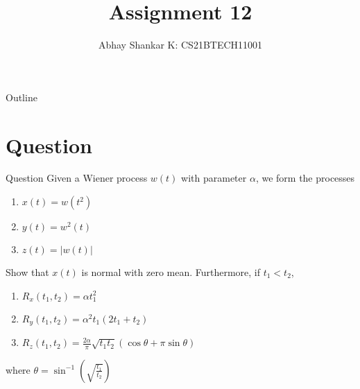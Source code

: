 \documentclass{beamer}
\begin{document}
\newcommand{\bfr}[2]{\section{#1} \begin{frame}{#1} #2 \end{frame}}

	\title{Assignment 12}
		\author{ Abhay Shankar K: CS21BTECH11001}
\date{}
	\begin{frame}
    		\titlepage
	\end{frame}

	\begin{frame}{Outline}
    		\tableofcontents
	\end{frame}

	\providecommand{\brak}[1]{\ensuremath{\left(#1\right)}}
	\providecommand{\mn}[2]{\ensuremath{min\brak{#1, #2}}}
	\providecommand{\mx}[2]{\ensuremath{max\brak{#1, #2}}}
	\providecommand{\rpr}[2]{\ensuremath{P_{#1}\left(#2\right)}} %
	\providecommand{\spr}[1]{\ensuremath{P\left(#1\right)}} %
	\newcommand{\abs}[1]{\left| #1 \right|}
    \newcommand{\e}[1]{\ensuremath{e^{#1}}}

    \providecommand{\myroman}{\brak{\textbf{\roman*}}}
	
	\providecommand{\pdf}[2]{\ensuremath{p_{#2}\left(#1\right)}}
	\providecommand{\cdf}[2]{\ensuremath{P_{#2}\left(#1\right)}}
    \providecommand{\inv}[1]{\ensuremath{\frac{1}{#1}}}
    
	
	\bfr{Question}{
		Given a Wiener process $w\brak{t}$ with parameter $\alpha$, we form the processes
        \begin{enumerate}[label = \textbf{\brak{\roman*}}]
            \item $x\brak{t} = w\brak{t^2}$
            \item $y\brak{t} = w^2\brak{t}$
            \item $z\brak{t} = \abs{w\brak{t}}$
        \end{enumerate}

        Show that $x\brak{t}$ is normal with zero mean. Furthermore, if $t_1 < t_2$,
        \begin{enumerate}[label = \textbf{\brak{\arabic*}}]
            \item $R_x\brak{t_1, t_2} = \alpha t_1^2$
            \item $R_y\brak{t_1, t_2} = \alpha^2 t_1 \brak{2t_1 + t_2}$
            \item $R_z\brak{t_1, t_2} = \frac{2 \alpha}{\pi} \sqrt{t_1 t_2} \brak{\cos{\theta} + \pi \sin{\theta}}$
        \end{enumerate} 
        where $\theta = \sin^{-1}(\sqrt{\frac{t_1}{t_2}})$
	}
\end{document}
